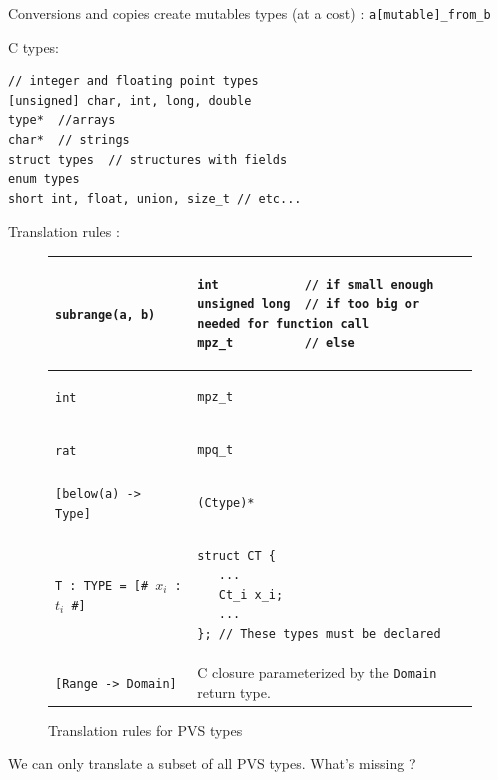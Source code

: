 \documentclass[12pt,a4paper,titlepage]{article}
\newcommand{\cl}[1]{\texttt{#1}}
\begin{document}
Conversions and copies create mutables types (at a cost) :
\cl{a[mutable]\_from\_b}

\cite{fillcomp}







C types:\\
\cite{huss2004c}
\begin{lstlisting}[caption=C types]
// integer and floating point types
[unsigned] char, int, long, double
type*  //arrays
char*  // strings
struct types  // structures with fields
enum types
short int, float, union, size_t // etc...
\end{lstlisting}


Translation rules :

\begin{figure}[!ht]
\begin{tabular}{|l|l|}
\hline
\cl{subrange(a, b)} &
\begin{lstlisting}
int            // if small enough
unsigned long  // if too big or needed for function call
mpz_t          // else
\end{lstlisting} \\ \hline
\cl{int} &
\begin{lstlisting}
mpz_t
\end{lstlisting} \\ \hline
\cl{rat} &
\begin{lstlisting}
mpq_t
\end{lstlisting} \\ \hline
\cl{[below(a) -> Type]} &
\begin{lstlisting}
(Ctype)*
\end{lstlisting} \\ \hline
\cl{T : TYPE = [\# $x_i$ : $t_i$ \#]}  &
\begin{lstlisting}
struct CT {
   ...
   Ct_i x_i;
   ...
}; // These types must be declared
\end{lstlisting} \\ \hline
\cl{[Range -> Domain]} & C closure parameterized by the \cl{Domain} return type.\\ \hline
\end{tabular}
\caption{Translation rules for PVS types}
\end{figure}









We can only translate a subset of all PVS types.
What's missing ?
\end{document}
